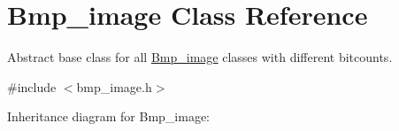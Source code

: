 \hypertarget{classBmp__image}{}\section{Bmp\+\_\+image Class Reference}
\label{classBmp__image}


Abstract base class for all \hyperlink{classBmp__image}{Bmp\+\_\+image} classes with different bitcounts.  




{\ttfamily \#include $<$bmp\+\_\+image.\+h$>$}



Inheritance diagram for Bmp\+\_\+image\+:
